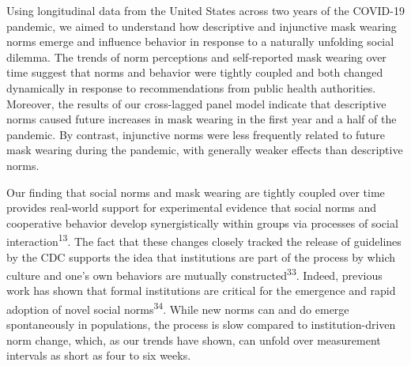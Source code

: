 \documentclass[
  man, donotrepeattitle,floatsintext]{apa6}
\begin{document}
Using longitudinal data from the United States across two years of the COVID-19 pandemic, we aimed to understand how descriptive and injunctive mask wearing norms emerge and influence behavior in response to a naturally unfolding social dilemma. The trends of norm perceptions and self-reported mask wearing over time suggest that norms and behavior were tightly coupled and both changed dynamically in response to recommendations from public health authorities. Moreover, the results of our cross-lagged panel model indicate that descriptive norms caused future increases in mask wearing in the first year and a half of the pandemic. By contrast, injunctive norms were less frequently related to future mask wearing during the pandemic, with generally weaker effects than descriptive norms.

Our finding that social norms and mask wearing are tightly coupled over time provides real-world support for experimental evidence that social norms and cooperative behavior develop synergistically within groups via processes of social interaction\textsuperscript{13}. The fact that these changes closely tracked the release of guidelines by the CDC supports the idea that institutions are part of the process by which culture and one's own behaviors are mutually constructed\textsuperscript{33}. Indeed, previous work has shown that formal institutions are critical for the emergence and rapid adoption of novel social norms\textsuperscript{34}. While new norms can and do emerge spontaneously in populations, the process is slow compared to institution-driven norm change, which, as our trends have shown, can unfold over measurement intervals as short as four to six weeks.
\end{document}
